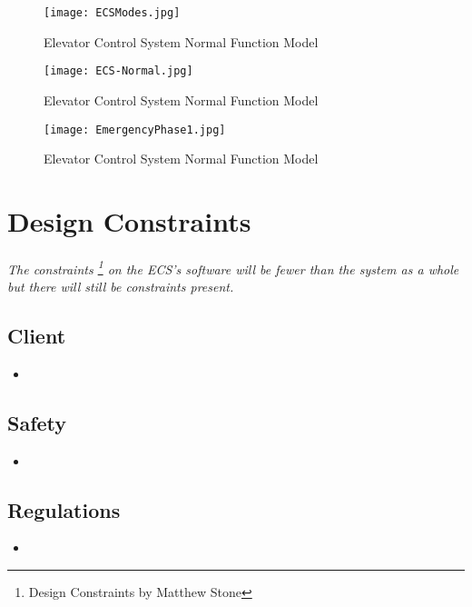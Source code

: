 \documentclass[12pt]{article}
\begin{document}
		\begin{figure}[H]
  			\centerline{\texttt{[image: ECSModes.jpg]}}
  			\caption{Elevator Control System Normal Function Model }
  			\label{fig:normal}
		\end{figure}

		\begin{figure}[H]
  			\centerline{\texttt{[image: ECS-Normal.jpg]}}
  			\caption{Elevator Control System Normal Function Model }
  			\label{fig:normal}
		\end{figure}
	
		\begin{figure}[H]
  			\centerline{\texttt{[image: EmergencyPhase1.jpg]}}
  			\caption{Elevator Control System Normal Function Model }
  			\label{fig:emerg}
		\end{figure}

\section{Design Constraints} \label{cons} %
	\paragraph{} \textit{The constraints \footnote{Design Constraints by Matthew Stone} on the ECS’s software will be fewer than the system 
	as a whole but there will still be constraints present.}

	\subsection{Client}
	\begin{itemize}
		\item 
	\end{itemize}

	\subsection{Safety}
	\begin{itemize}
		\item 
	\end{itemize}

	\subsection{Regulations}
	\begin{itemize}
		\item 
	\end{itemize}
\end{document}
